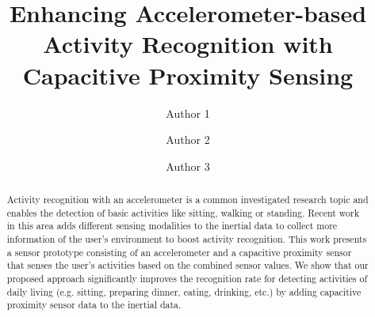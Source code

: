 \documentclass[runningheads,a4paper]{llncs}
\begin{document}
\mainmatter  %

\title{Enhancing Accelerometer-based Activity Recognition with Capacitive Proximity Sensing}


\author{Author 1 \and Author 2 \and Author 3 }





\maketitle
\begin{abstract}
Activity recognition with an accelerometer is a common investigated research topic and enables the detection of basic activities like sitting, walking or standing. Recent work in this area adds different sensing modalities to the inertial data to collect more information of the user's environment to boost activity recognition. This work presents a sensor prototype consisting of an accelerometer and a capacitive proximity sensor that senses the user's activities based on the combined sensor values. We show that our proposed approach significantly improves the recognition rate for detecting activities of daily living (e.g. sitting, preparing dinner, eating, drinking, etc.) by adding capacitive proximity sensor data to the inertial data.
\end{abstract}
\end{document}
